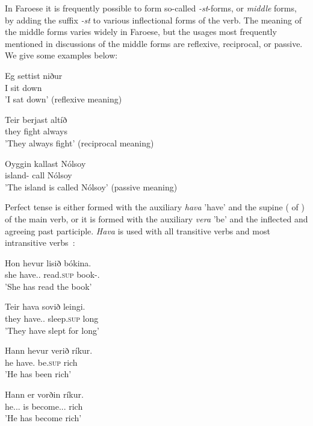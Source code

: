 \documentclass[12pt,%
    times,
]{lin-v2/lin}
\begin{document}
In Faroese it is frequently possible to form so-called \emph{-st}-forms, or \emph{middle} forms, by adding the suffix
\emph{-st} to various inflectional forms of the verb. The meaning of the middle forms varies widely in Faroese, but
the usages most frequently mentioned in discussions of the middle forms are reflexive, reciprocal, or passive.
We give some examples below:
\begin{exe}
    \ex
    \begin{xlist}
        \item \gll Eg settist niður\\
        I sit down\\
        \trans 'I sat down' (reflexive meaning)
        \item \gll Teir berjast altíð\\
        they fight always\\
        \trans 'They always fight' (reciprocal meaning)
        \item \gll Oyggin kallast Nólsoy\\
        island-\Det{} call Nólsoy\\
        \trans 'The island is called Nólsoy' (passive meaning)
    \end{xlist}
\end{exe}

Perfect tense is either formed with the auxiliary \emph{hava} 'have' and the supine (\Sg\N{} of \Pst\Ptcp{}) of the main verb,
or it is formed with the auxiliary \emph{vera} 'be' and the inflected and agreeing past participle. \emph{Hava} is used
with all transitive verbs and most intransitive verbs~\citep[72]{faroese}:
\begin{exe}
    \ex
    \begin{xlist}
        \item \gll Hon hevur lisið bókina.\\
        she have.\Third\Sg.\Pst{} read.\textsc{sup} book-\Det.\Acc\\
        \trans 'She has read the book'
        \item \gll Teir hava sovið leingi.\\
        they have.\Third\Pl.\Pst{} sleep.\textsc{sup} long\\
        \trans 'They have slept for long'
        \item \gll Hann hevur verið ríkur.\\
        he have\Third\Sg.\Pst{} be.\textsc{sup} rich\\
        \trans 'He has been rich'
        \item \gll Hann er vorðin ríkur.\\
        he.\Nom.\Sg.\M{} is become.\Nom.\Sg.\M{} rich\\
        \trans 'He has become rich'
    \end{xlist}
\end{exe}
\end{document}

